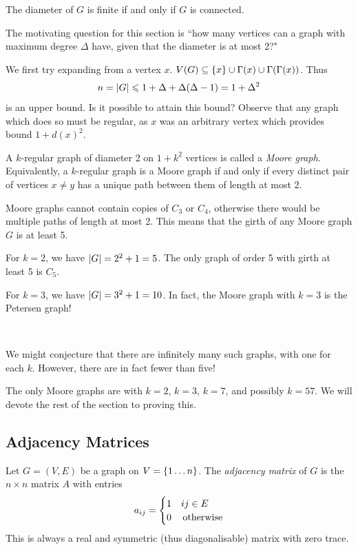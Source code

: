 \documentclass{article}
\begin{document}
\begin{corollary}
	The diameter of $G$ is finite if and only if $G$ is connected.
\end{corollary}

The motivating question for this section is ``how many vertices can a graph with maximum degree $\Delta$ have, given that the diameter is at most 2?"

We first try expanding from a vertex $x$. $V(G) \subseteq \left\lbrace x \right\rbrace \cup \Gamma(x) \cup \Gamma(\Gamma(x))$. Thus
\[
n = \left\lvert G \right\rvert \leqslant 1 + \Delta + \Delta(\Delta - 1) = 1+\Delta^2
\]
is an upper bound. Is it possible to attain this bound? Observe that any graph which does so must be regular, as $x$ was an arbitrary vertex which provides bound $1 + d(x)^2$.

\begin{definition}
    A $k$-regular graph of diameter 2 on $1+k^2$ vertices is called a \textit{Moore graph}. Equivalently, a $k$-regular graph is a Moore graph if and only if every distinct pair of vertices $x \neq y$ has a unique path between them of length at most 2.
\end{definition}

Moore graphs cannot contain copies of $C_3$ or $C_4$, otherwise there would be multiple paths of length at most 2. This means that the girth of any Moore graph $G$ is at least 5.

For $k = 2$, we have $\left\lvert G \right\rvert = 2^2 + 1 = 5$. The only graph of order 5 with girth at least 5 is $C_5$.

For $k = 3$, we have $\left\lvert G \right\rvert = 3^2 + 1 = 10$. In fact, the Moore graph with $k=3$ is the Petersen graph!

\  \

We might conjecture that there are infinitely many such graphs, with one for each $k$. However, there are in fact fewer than five!

The only Moore graphs are with $k = 2$, $k = 3$, $k = 7$, and possibly $k = 57$. We will devote the rest of the section to proving this.


\subsection{Adjacency Matrices}

\begin{definition}
    Let $G = (V, E)$ be a graph on $V = \left\lbrace 1 \dots n \right\rbrace$. The \textit{adjacency matrix} of $G$ is the $n \times n$ matrix $A$ with entries
    \[
	a_{ij} = \begin{cases}
		1 & ij \in E \\
		0 & \mathrel{\, \text{otherwise}}
	\end{cases}
	\]
	This is always a real and symmetric (thus diagonalisable) matrix with zero trace.
\end{definition}
\end{document}
